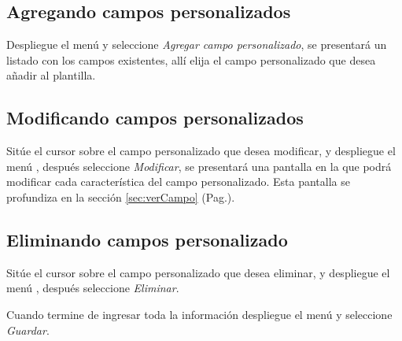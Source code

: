 \subsection{Agregando campos personalizados}
\label{sec:agregarCamposPlantilla}
Despliegue el men\'u \blackberry y seleccione \emph{Agregar campo personalizado}, se
presentar\'a un listado con los campos existentes, all\'i elija el campo
personalizado que desea a\~nadir al plantilla.

\subsection{Modificando campos personalizados}
\label{sec:modificarCamposPlantilla}
Sit\'ue el cursor sobre el campo personalizado que desea modificar, y despliegue el
men\'u \blackberry, despu\'es seleccione \emph{Modificar},
se presentar\'a una pantalla en la que podr\'a modificar cada caracter\'istica
del campo personalizado. Esta pantalla se profundiza en la secci\'on
\ref{sec:verCampo} (Pag.\pageref{sec:verCampo}).

\subsection{Eliminando campos personalizado}
\label{sec:eliminarCamposPlantilla}
Sit\'ue el cursor sobre el campo personalizado que desea eliminar, y despliegue el
men\'u \blackberry, despu\'es seleccione \emph{Eliminar}.

Cuando termine de ingresar toda la informaci\'on despliegue el men\'u \blackberry y
seleccione \emph{Guardar}.